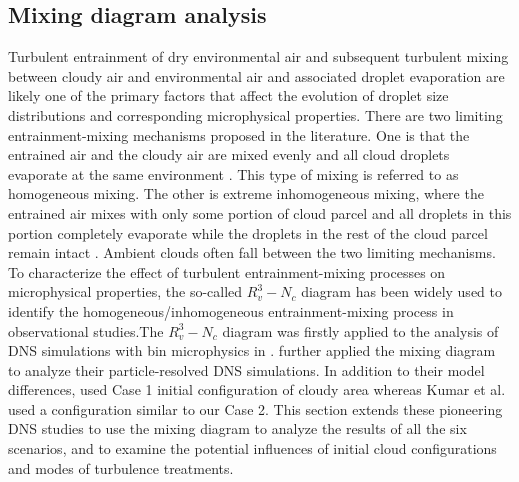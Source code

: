 \documentclass[draft,linenumbers]{agujournal}
\begin{document}
\subsection{Mixing diagram analysis}
Turbulent entrainment of dry environmental air and subsequent turbulent mixing between cloudy air and environmental air and associated droplet evaporation are likely one of the primary factors that affect the evolution of droplet size distributions and corresponding microphysical properties. There are two limiting entrainment-mixing mechanisms proposed in the literature. One is that the entrained air and the cloudy air are mixed evenly and all cloud droplets evaporate at the same environment \citep{Warner1973}. This type of mixing is referred to as homogeneous mixing. The other is extreme inhomogeneous mixing, where the entrained air mixes with only some portion of cloud parcel and all droplets in this portion completely evaporate while the droplets in the rest of the cloud parcel remain intact \citep{Baker1980}. Ambient clouds often fall between the two limiting mechanisms. To characterize the effect of turbulent entrainment-mixing processes on microphysical properties, the {so-called $R_v^3-N_c$ diagram \citep{Jensen1985, Burnet2007Observational} has been widely used} to identify the homogeneous/inhomogeneous entrainment-mixing process in observational studies.{The $R_v^3-N_c$ diagram was firstly applied to the analysis of DNS simulations with bin microphysics in \citet{And04, And06, And09}.} \citet{Kumar14} further applied the mixing diagram to analyze their particle-resolved DNS simulations. In addition to their model differences,  \citet{And04, And06, And09} used Case 1 initial configuration of cloudy area whereas Kumar et al. used a configuration similar to our Case 2. {This section extends these pioneering DNS studies to use the mixing diagram to analyze the results of all the six scenarios, and to examine the potential influences of initial cloud configurations and modes of turbulence treatments.}
\end{document}
